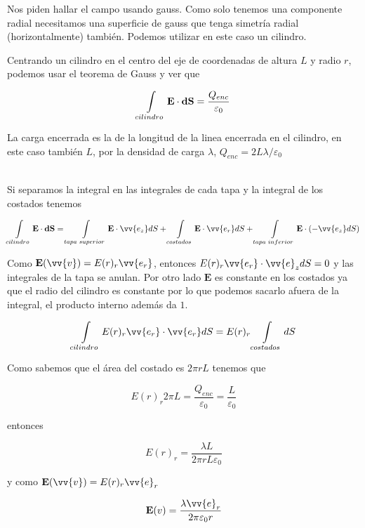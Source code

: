 \documentclass[leqno, 12pt, twoside, letterpaper]{book}
\def\efield{\textbf{E}}
\def\vdiff{\textbf{dS}}
\begin{document}
Nos piden hallar el campo usando gauss. Como solo tenemos una componente radial necesitamos una superficie de gauss que tenga simetría radial (horizontalmente) también. Podemos utilizar en este caso un cilindro.

Centrando un cilindro en el centro del eje de coordenadas de altura $L$ y radio $r$, podemos usar el teorema de Gauss y ver que 

\[ \int\displaylimits_{cilindro} \efield \cdot \vdiff = \dfrac{Q_{enc}}{\varepsilon_0}  \]

La carga encerrada es la de la longitud de la linea encerrada en el cilindro, en este caso también $L$, por la densidad de carga $\lambda$, $Q_{enc} = 2L\lambda/\varepsilon_0$

\hfill\\
\noindent Si separamos la integral en las integrales de cada tapa y la integral de los costados tenemos

\[ \int\displaylimits_{cilindro} \efield \cdot \vdiff = \int\displaylimits_{tapa\,\, superior} \efield \cdot \vv{e_z}dS  + \int\displaylimits_{costados} \efield \cdot \vv{e_r}dS  + \int\displaylimits_{tapa\,\, inferior} \efield \cdot (-\vv{e_z}dS )\]

Como $\efield(\vv{v}) = E(r)_r \vv{e_r} $, entonces $E(r)_r \vv{e_r}  \cdot \vv{e}_z dS = 0$ y las integrales de la tapa se anulan. Por otro lado $\efield$ es constante en los costados ya que el radio del cilindro es constante por lo que podemos sacarlo afuera de la integral, el producto interno además da $1$.

\[ \int\displaylimits_{cilindro} E(r)_r \vv{e_r} \cdot \vv{e_r}dS =   E(r)_r  \int\displaylimits_{costados}dS \]

Como sabemos que el área del costado es $2\pi r L$ tenemos que

\[ E(r)_r 2\pi  L = \dfrac{Q_{enc}}{\varepsilon_0} = \dfrac{L}{\varepsilon_0} \]

entonces

\[ E(r)_r = \dfrac{\lambda L}{2\pi r L \varepsilon_0}\]

y como $\efield(\vv{v}) = E(r)_r \vv{e}_r$

\[ \efield(v) = \dfrac{\lambda \vv{e}_r}{2\pi  \varepsilon_0r} \]
\end{document}

